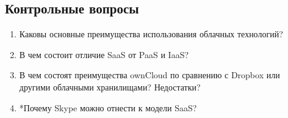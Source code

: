 \subsection{Контрольные вопросы}
\begin{enumerate}
    \item Каковы основные преимущества использования облачных технологий?
    \item В чем состоит отличие SaaS от PaaS и IaaS?
    \item В чем состоят преимущества ownCloud по сравнению с Dropbox или другими облачными хранилищами? Недостатки?
    \item *Почему Skype можно отнести к модели SaaS?
\end{enumerate}

\clearpage
